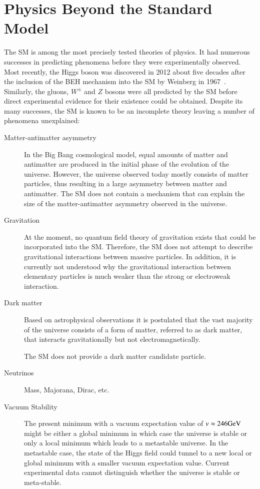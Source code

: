 \section{Physics Beyond the Standard Model}

The SM is among the most precisely tested theories of physics. It had numerous
successes in predicting phenomena before they were experimentally observed. Most
recently, the Higgs boson was discovered in 2012 about five decades after the
inclusion of the BEH mechanism into the SM by Weinberg in
1967~\cite{Weinberg:1967tq}. Similarly, the gluons, $W^\pm$ and $Z$ bosons were
all predicted by the SM before direct experimental evidence for their existence
could be obtained. Despite its many successes, the SM is known to be an
incomplete theory leaving a number of phenomena unexplained:
\begin{description}

\item[Matter-antimatter asymmetry] In the Big Bang cosmological model, equal
  amounts of matter and antimatter are produced in the initial phase of the
  evolution of the universe. However, the universe observed today mostly
  consists of matter particles, thus resulting in a large asymmetry between
  matter and antimatter. The SM does not contain a mechanism that can explain
  the size of the matter-antimatter asymmetry observed in the universe.

\item[Gravitation] At the moment, no quantum field theory of gravitation exists
  that could be incorporated into the SM. Therefore, the SM does not attempt to
  describe gravitational interactions between massive particles. In addition, it
  is currently not understood why the gravitational interaction between
  elementary particles is much weaker than the strong or electroweak
  interaction.

\item[Dark matter] Based on astrophysical observations it is postulated that the
  vast majority of the universe consists of a form of matter, referred to as
  dark matter, that interacts gravitationally but not electromagnetically.

  The SM does not provide a dark matter candidate particle.

\item[]

\item[Neutrinos] Mass, Majorana, Dirac, etc.

\item[Vacuum Stability] The present minimum with a vacuum expectation
  value of $v \approx \si{246}{\ensuremath{\text{GeV}}}$ might be either a global minimum
  in which case the universe is stable or only a local minimum which
  leads to a metastable universe. In the metastable case, the state of
  the Higgs field could tunnel to a new local or global minimum with a
  smaller vacuum expectation value. Current experimental data cannot
  distinguish whether the universe is stable or
  meta-stable.


\end{description}
